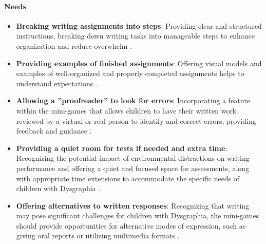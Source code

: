 \paragraph{Needs}
\begin{itemize}
    \item \textbf{Breaking writing assignments into steps}: Providing clear and structured instructions, breaking down writing tasks into manageable steps to enhance organization and reduce overwhelm \cite{understood_accommodations}.
    \item \textbf{Providing examples of finished assignments}: Offering visual models and examples of well-organized and properly completed assignments helps to understand expectations \cite{understood_accommodations}.
    \item \textbf{Allowing a ''proofreader'' to look for errors}: Incorporating a feature within the mini-games that allows children to have their written work reviewed by a virtual or real person to identify and correct errors, providing feedback and guidance \cite{understood_accommodations}.
    \item \textbf{Providing a quiet room for tests if needed and extra time}: Recognizing the potential impact of environmental distractions on writing performance and offering a quiet and focused space for assessments, along with appropriate time extensions to accommodate the specific needs of children with Dysgraphia \cite{understood_accommodations}.
    \item \textbf{Offering alternatives to written responses}: Recognizing that writing may pose significant challenges for children with Dysgraphia, the mini-games should provide opportunities for alternative modes of expression, such as giving oral reports or utilizing multimedia formats \cite{understood_accommodations}.
\end{itemize}